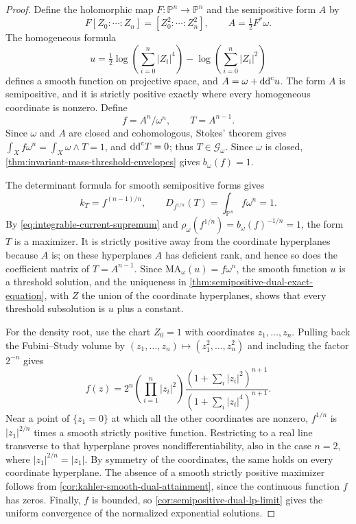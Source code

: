 \begin{proof}
Define the holomorphic map $F\colon\mathbb P^n\to\mathbb P^n$ and the semipositive form $A$ by
\[
 F[Z_0:\cdots:Z_n]=[Z_0^2:\cdots:Z_n^2],\qquad
 A=\tfrac12F^*\omega.
\]
The homogeneous formula
\[
 u=\tfrac12\log\!\left(\sum_{i=0}^n|Z_i|^4\right)
       -\log\!\left(\sum_{i=0}^n|Z_i|^2\right)
\]
defines a smooth function on projective space, and $A=\omega+\mathrm{dd}^{\mathrm{c}} u$. The form $A$ is semipositive, and it is strictly positive exactly where every homogeneous coordinate is nonzero. Define
\[
 f=A^n/\omega^n,\qquad T=A^{n-1}.
\]
Since $\omega$ and $A$ are closed and cohomologous, Stokes' theorem gives $\int_X f\omega^n=\int_X\omega\wedge T=1$, and $\mathrm{dd}^{\mathrm{c}} T=0$; thus $T\in\mathscr G_\omega$. Since $\omega$ is closed, \cref{thm:invariant-mass-threshold-envelopes} gives $b_\omega(f)=1$.

The determinant formula for smooth semipositive forms gives
\[
 k_T=f^{(n-1)/n},\qquad
 D_{f^{1/n}}(T)=\int_{\mathbb P^n}f\omega^n=1.
\]
By \eqref{eq:integrable-current-supremum} and $\rho_\omega(f^{1/n})=b_\omega(f)^{-1/n}=1$, the form $T$ is a maximizer. It is strictly positive away from the coordinate hyperplanes because $A$ is; on these hyperplanes $A$ has deficient rank, and hence so does the coefficient matrix of $T=A^{n-1}$. Since $\mathrm{MA}_\omega(u)=f\omega^n$, the smooth function $u$ is a threshold solution, and the uniqueness in \cref{thm:semipositive-dual-exact-equation}, with $Z$ the union of the coordinate hyperplanes, shows that every threshold subsolution is $u$ plus a constant.

For the density root, use the chart $Z_0=1$ with coordinates $z_1,\ldots,z_n$. Pulling back the Fubini--Study volume by $(z_1,\ldots,z_n)\mapsto(z_1^2,\ldots,z_n^2)$ and including the factor $2^{-n}$ gives
\[
 f(z)=2^n\left(\prod_{i=1}^n|z_i|^2\right)
       \frac{(1+\sum_i|z_i|^2)^{n+1}}
            {(1+\sum_i|z_i|^4)^{n+1}}.
\]
Near a point of $\{z_1=0\}$ at which all the other coordinates are nonzero, $f^{1/n}$ is $|z_1|^{2/n}$ times a smooth strictly positive function. Restricting to a real line transverse to that hyperplane proves nondifferentiability, also in the case $n=2$, where $|z_1|^{2/n}=|z_1|$. By symmetry of the coordinates, the same holds on every coordinate hyperplane. The absence of a smooth strictly positive maximizer follows from \cref{cor:kahler-smooth-dual-attainment}, since the continuous function $f$ has zeros. Finally, $f$ is bounded, so \cref{cor:semipositive-dual-lp-limit} gives the uniform convergence of the normalized exponential solutions.
\end{proof}
